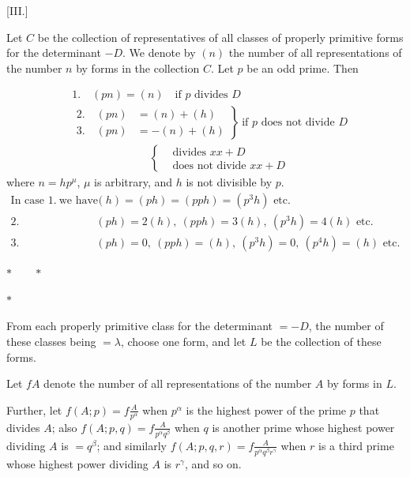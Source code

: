 \clearpage
\par\bigskip{}\centerline{[III.]}\medskip
Let $C$ be the collection of representatives of all classes of properly primitive forms for the determinant $-D$. We denote by $(n)$ the number of all representations of the number $n$ by forms in the collection $C$. Let $p$ be an odd prime. Then

\[
\begin{aligned}
&1.\quad(pn)=(n)\quad\text{if }p\text{ divides }D\\
&\left.\begin{aligned}2.\quad(pn)&=(n)+(h)\\3.\quad(pn)&=-(n)+(h)\end{aligned}\right\}
\ \text{if }p\text{ does not divide }D\\
&\hspace{7em}\left\{\begin{aligned}&\text{divides }xx+D\\&\text{does not divide }xx+D\end{aligned}\right.
\end{aligned}
\]
where $n=hp^\mu$, $\mu$ is arbitrary, and $h$ is not divisible by $p$.
\[
\begin{aligned}
\text{In case }1.\ \text{we have}\quad&(h)=(ph)=(pph)=(p^3h)\text{ etc.}\\
2.\quad&(ph)=2(h),\ (pph)=3(h),\ (p^3h)=4(h)\text{ etc.}\\
3.\quad&(ph)=0,\ (pph)=(h),\ (p^3h)=0,\ (p^4h)=(h)\text{ etc.}
\end{aligned}
\]
\begin{center}$\ast\qquad\ast$\par$\ast$\end{center}

From each properly primitive class for the determinant $=-D$, the number of these classes being $=\lambda$, choose one form, and let $L$ be the collection of these forms.

Let $fA$ denote the number of all representations of the number $A$ by forms in $L$.

Further, let $f(A;p)=f\frac A{p^\alpha}$ when $p^\alpha$ is the highest power of the prime $p$ that divides $A$; also $f(A;p,q)=f\frac A{p^\alpha q^\beta}$ when $q$ is another prime whose highest power dividing $A$ is $=q^\beta$; and similarly $f(A;p,q,r)=f\frac A{p^\alpha q^\beta r^\gamma}$ when $r$ is a third prime whose highest power dividing $A$ is $r^\gamma$, and so on.
